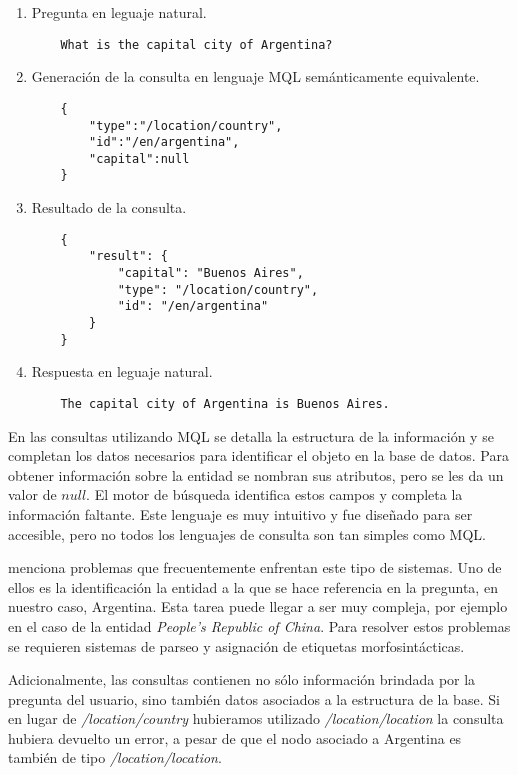 \begin{example}\label{QALD-etapas}\hfill
    \begin{enumerate}
        \item Pregunta en leguaje natural.
            \begin{lstlisting}
    What is the capital city of Argentina?
            \end{lstlisting}
        \item Generación de la consulta en lenguaje MQL semánticamente equivalente.
            \begin{lstlisting}
    {
        "type":"/location/country",
        "id":"/en/argentina",
        "capital":null
    }
            \end{lstlisting}
        \item Resultado de la consulta.
            \begin{lstlisting}
    {
        "result": {
            "capital": "Buenos Aires",
            "type": "/location/country",
            "id": "/en/argentina"
        }
    }
            \end{lstlisting}
        \item Respuesta en leguaje natural.
            \begin{lstlisting}
    The capital city of Argentina is Buenos Aires.
            \end{lstlisting}
    \end{enumerate}
\end{example}

En las consultas utilizando MQL se detalla la estructura de la información y se completan los datos necesarios para identificar el objeto en la base de datos. Para obtener información sobre la entidad se nombran sus atributos, pero se les da un valor de $null$. El motor de búsqueda identifica estos campos y completa la información faltante. Este lenguaje es muy intuitivo y fue diseñado para ser accesible, pero no todos los lenguajes de consulta son tan simples como MQL.

\citet{ungerQALD} menciona problemas que frecuentemente enfrentan este tipo de sistemas. Uno de ellos es la identificación la entidad a la que se hace referencia en la pregunta, en nuestro caso, Argentina. Esta tarea puede llegar a ser muy compleja, por ejemplo en el caso de la entidad \textit{People's Republic of China}. Para resolver estos problemas se requieren sistemas de parseo y asignación de etiquetas morfosintácticas.

Adicionalmente, las consultas contienen no sólo información brindada por la pregunta del usuario, sino también datos asociados a la estructura de la base. Si en lugar de \textit{/location/country} hubieramos utilizado \textit{/location/location} la consulta hubiera devuelto un error, a pesar de que el nodo asociado a Argentina es también de tipo \textit{/location/location}.

